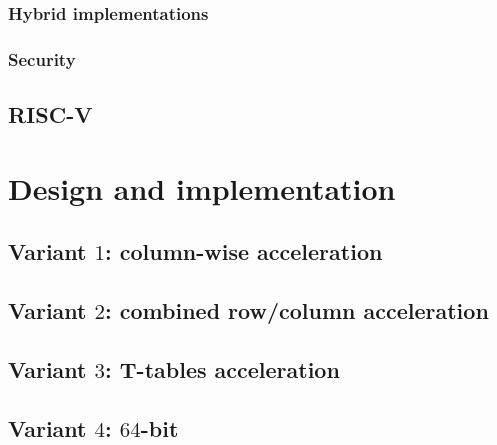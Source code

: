 \documentclass[submission]{iacrtrans}
\begin{document}
\subsubsection{Hybrid        implementations}
\label{sec:bg:aes_impl_ise}


\subsubsection{Security}
\label{sec:bg:aes_impl_sec}



\subsection{RISC-V}
\label{sec:bg:riscv}



\section{Design and implementation}
\label{sec:design}



\subsection{Variant $1$: column-wise acceleration}
\label{sec:design:v1}


\subsection{Variant $2$: combined row/column acceleration}
\label{sec:design:v2}


\subsection{Variant $3$: T-tables acceleration}
\label{sec:design:v3}


\subsection{Variant $4$: $64$-bit}
\label{sec:design:v4}

\end{document}
